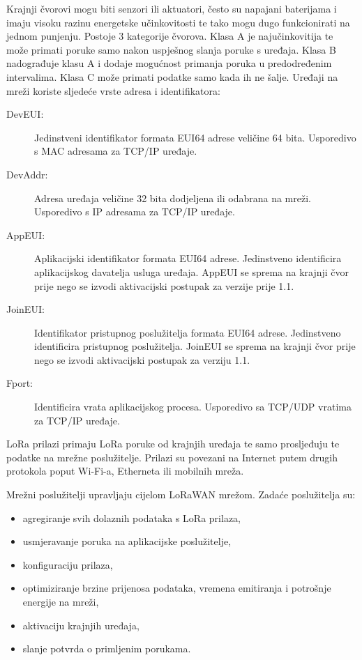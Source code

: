 \documentclass[times, utf8, diplomski]{fer}
\begin{document}
Krajnji čvorovi mogu biti senzori ili aktuatori, često su napajani baterijama i imaju visoku razinu energetske učinkovitosti te tako mogu dugo funkcionirati na jednom punjenju. Postoje 3 kategorije čvorova. Klasa A je najučinkovitija te može primati poruke samo nakon uspješnog slanja poruke s uređaja. Klasa B nadograđuje klasu A i dodaje mogućnost primanja poruka u predodređenim intervalima. Klasa C može primati podatke samo kada ih ne šalje. Uređaji na mreži koriste sljedeće vrste adresa i identifikatora:
\begin{description}
    \item[DevEUI:]Jedinstveni identifikator formata EUI64  adrese veličine 64 bita. Usporedivo s MAC adresama za TCP/IP uređaje.
    \item[DevAddr:]Adresa uređaja veličine 32 bita dodjeljena ili odabrana na mreži. Usporedivo s IP adresama za TCP/IP uređaje.
    \item[AppEUI:]Aplikacijski identifikator formata EUI64 adrese. Jedinstveno identificira aplikacijskog davatelja usluga uređaja. AppEUI se sprema na krajnji čvor prije nego se izvodi aktivacijski postupak za verzije prije 1.1.
    \item[JoinEUI:]Identifikator pristupnog poslužitelja formata EUI64 adrese. Jedinstveno identificira pristupnog poslužitelja. JoinEUI se sprema na krajnji čvor prije nego se izvodi aktivacijski postupak za verziju 1.1.
    \item[Fport:]Identificira vrata aplikacijskog procesa. Usporedivo sa TCP/UDP vratima za TCP/IP uređaje.
\end{description}

LoRa prilazi primaju LoRa poruke od krajnjih uređaja te samo prosljeđuju te podatke na mrežne poslužitelje. Prilazi su povezani na Internet putem drugih protokola poput Wi-Fi-a, Etherneta ili mobilnih mreža.

Mrežni poslužitelji upravljaju cijelom LoRaWAN mrežom. Zadaće poslužitelja su:
\begin{itemize}
    \item agregiranje svih dolaznih podataka s LoRa prilaza,
    \item usmjeravanje poruka na aplikacijske poslužitelje,
    \item konfiguraciju prilaza,
    \item optimiziranje brzine prijenosa podataka, vremena emitiranja i potrošnje energije na mreži,
    \item aktivaciju krajnjih uređaja,
    \item slanje potvrda o primljenim porukama.
\end{itemize}
\end{document}
